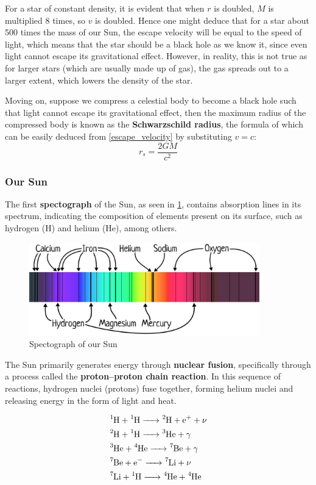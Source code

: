 \documentclass[12pt,a4paper]{article}
\begin{document}
For a star of constant density, it is evident that when $r$ is doubled, $M$ is multiplied 8 times, so $v$ is doubled. Hence one might deduce that for a star about 500 times the mass of our Sun, the escape velocity will be equal to the speed of light, which means that the star should be a black hole as we know it, since even light cannot escape its gravitational effect. However, in reality, this is not true as for larger stars (which are usually made up of gas), the gas spreads out to a larger extent, which lowers the density of the star.

Moving on, suppose we compress a celestial body to become a black hole such that light cannot escape its gravitational effect, then the maximum radius of the compressed body is known as the \textbf{Schwarzschild radius}, the formula of which can be easily deduced from \cref{escape_velocity} by substituting $v=c$:
\begin{equation}
r_s = \frac{2GM}{c^2}
\end{equation}

\subsubsection{Our Sun}
The first \textbf{spectograph} of the Sun, as seen in \cref{fig:spectograph}, contains absorption lines in its spectrum, indicating the composition of elements present on its surface, such as hydrogen (H) and helium (He), among others.

\begin{figure}[H]
    \centering
    \includegraphics[width=10cm]{images/spectograph_sun.jpg}
    \caption{Spectograph of our Sun}
    \label{fig:spectograph}
\end{figure}

The Sun primarily generates energy through \textbf{nuclear fusion}, specifically through a process called the \textbf{proton--proton chain reaction}. In this sequence of reactions, hydrogen nuclei (protons) fuse together, forming helium nuclei and releasing energy in the form of light and heat.

\begin{align*}
&\ce{^1H + ^1H -> ^2H + e^+ + \nu} \\
&\ce{^2H + ^1H -> ^3He + \gamma} \\
&\ce{^3He + ^4He -> ^7Be + \gamma} \\
&\ce{^7Be + e^- -> ^7Li + \nu} \\
&\ce{^7Li + ^1H -> ^4He + ^4He}
\end{align*}
\end{document}
